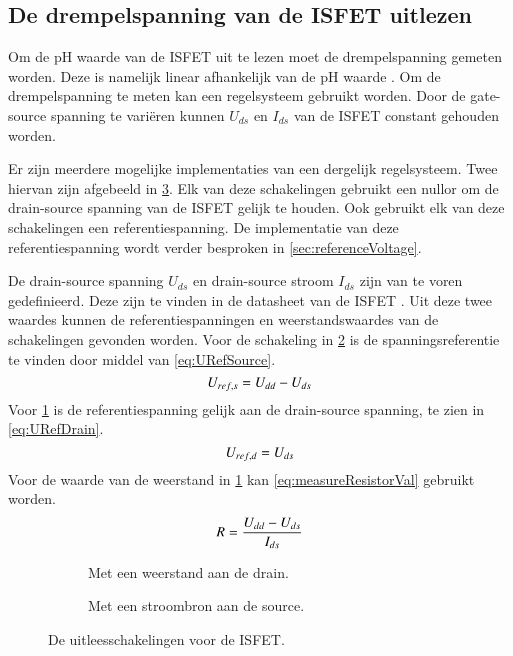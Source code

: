 \subsection{De drempelspanning van de ISFET uitlezen} \label{sec:ISFETLees}

Om de pH waarde van de ISFET uit te lezen moet de drempelspanning gemeten worden. Deze is namelijk linear afhankelijk van de pH waarde \cite{iontjes}.
Om de drempelspanning te meten kan een regelsysteem gebruikt worden. Door de gate-source spanning te variëren kunnen $U_{ds}$ en $I_{ds}$ van de ISFET constant gehouden worden.

Er zijn meerdere mogelijke implementaties van een dergelijk regelsysteem. Twee hiervan zijn afgebeeld in \cref{fig:measureCircuits}.
Elk van deze schakelingen gebruikt een nullor om de drain-source spanning van de ISFET gelijk te houden. Ook gebruikt elk van deze schakelingen een referentiespanning. De implementatie van deze referentiespanning wordt verder besproken in \cref{sec:referenceVoltage}.

De drain-source spanning $U_{ds}$ en drain-source stroom $I_{ds}$ zijn van te voren gedefinieerd. Deze zijn te vinden in de datasheet van de ISFET \cite{isfet}. Uit deze twee waardes kunnen de referentiespanningen en weerstandswaardes van de schakelingen gevonden worden.
Voor de schakeling in \cref{fig:measureCurrent} is de spanningsreferentie te vinden door middel van \cref{eq:URefSource}.
\begin{equation}\label{eq:URefSource}
    U_{ref,s} = U_{dd} - U_{ds}
    \tagaddtext{[\si{\volt}]}
\end{equation}
Voor \cref{fig:measureResistor} is de referentiespanning gelijk aan de drain-source spanning, te zien in \cref{eq:URefDrain}.
\begin{equation}\label{eq:URefDrain}
    U_{ref,d} = U_{ds}
    \tagaddtext{[\si{\volt}]}
\end{equation}
Voor de waarde van de weerstand in \cref{fig:measureResistor} kan \cref{eq:measureResistorVal} gebruikt worden.
\begin{equation}\label{eq:measureResistorVal}
    R = \frac{U_{dd} - U_{ds}}{I_{ds}}
    \tagaddtext{[\si{\ohm}]}
\end{equation}


\begin{figure}[ht]
    \centering
    \begin{subfigure}[b]{0.45\textwidth}
        \centering
        \def\svgwidth{\textwidth}
        
        \caption{Met een weerstand aan de drain.}
        \label{fig:measureResistor}
    \end{subfigure}
    \hfill
    \begin{subfigure}[b]{0.45\textwidth}
        \centering
        \def\svgwidth{\textwidth}
        
        \caption{Met een stroombron aan de source.}
        \label{fig:measureCurrent}
    \end{subfigure}
    \caption{De uitleesschakelingen voor de ISFET.}
    \label{fig:measureCircuits}
\end{figure}

